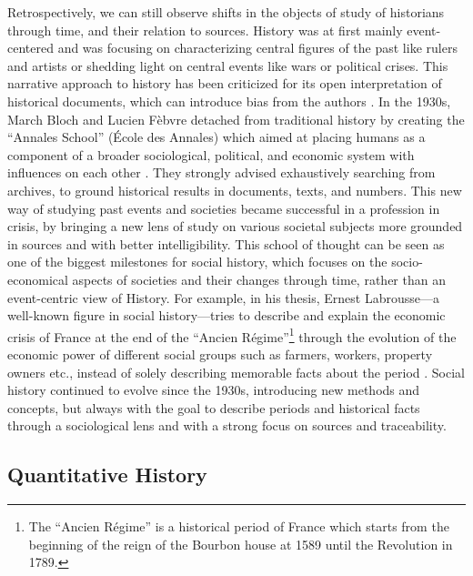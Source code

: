 Retrospectively, we can still observe shifts in the objects of study of historians through time, and their relation to sources.
History was at first mainly event-centered and was focusing on characterizing central figures of the past like rulers and artists or shedding light on central events like wars or political crises.
This narrative approach to history has been criticized for its open interpretation of historical documents, which can introduce bias from the authors \cite{bourdieuRapportsEntreSociologie1995}.
In the 1930s, March Bloch and Lucien Fèbvre detached from traditional history by creating the ``Annales School'' (\'Ecole des Annales) which aimed at placing humans as a component of a broader sociological, political, and economic system with influences on each other \cite{burkeHistorySocialTheory2005}.
They strongly advised exhaustively searching from archives, to ground historical results in documents, texts, and numbers.
This new way of studying past events and societies became successful in a profession in crisis, by bringing a new lens of study on various societal subjects more grounded in sources and with better intelligibility.
This school of thought can be seen as one of the biggest milestones for social history, which focuses on the socio-economical aspects of societies and their changes through time, rather than an event-centric view of History.
For example, in his thesis, Ernest Labrousse---a well-known figure in social history---tries to describe and explain the economic crisis of France at the end of the ``Ancien Régime''\footnote{The ``Ancien Régime'' is a historical period of France which starts from the beginning of the reign of the Bourbon house at 1589 until the Revolution in 1789.} through the evolution of the economic power of different social groups such as farmers, workers, property owners etc., instead of solely describing memorable facts about the period \cite{labrousse1990crise}.
Social history continued to evolve since the 1930s, introducing new methods and concepts, but always with the goal to describe periods and historical facts through a sociological lens and with a strong focus on sources and traceability.


\subsection{Quantitative History}\label{subsec:quantitative-history}

